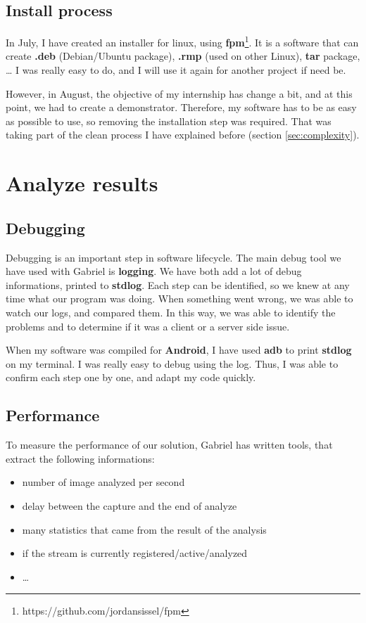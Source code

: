 \documentclass[a4paper,11pt]{custom}
\newcommand{\fpm}{\textbf{fpm}\xspace}
\newcommand{\android}{\textbf{Android}\xspace}
\begin{document}
\subsection{Install process}

In July, I have created an installer for linux, using
\fpm{}\footnote{https://github.com/jordansissel/fpm}. It is a software that can
create \textbf{.deb} (Debian/Ubuntu package), \textbf{.rmp} (used on other
Linux), \textbf{tar} package, … I was really easy to do, and I will use it again
for another project if need be.

However, in August, the objective of my internship has change a bit, and at this
point, we had to create a demonstrator. Therefore, my software has to be as easy
as possible to use, so removing the installation step was required. That was
taking part of the clean process I have explained before (section
\ref{sec:complexity}).

\section{Analyze results}

\subsection{Debugging}

Debugging is an important step in software lifecycle. The main debug tool we have
used with Gabriel is \textbf{logging}. We have both add a lot of debug
informations, printed to \textbf{stdlog}. Each step can be identified, so we knew
at any time what our program was doing. When something went wrong, we was able
to watch our logs, and compared them. In this way, we was able to identify
the problems and to determine if it was a client or a server side issue.

When my software was compiled for \android, I have used \textbf{adb} to print
\textbf{stdlog} on my terminal. I was really easy to debug using the log. Thus,
I was able to confirm each step one by one, and adapt my code quickly.

\subsection{Performance}

To measure the performance of our solution, Gabriel has written tools, that
extract the following informations:
\begin{itemize}
\item number of image analyzed per second
\item delay between the capture and the end of analyze
\item many statistics that came from the result of the analysis
\item if the stream is currently registered/active/analyzed
\item …
\end{itemize}
\end{document}
